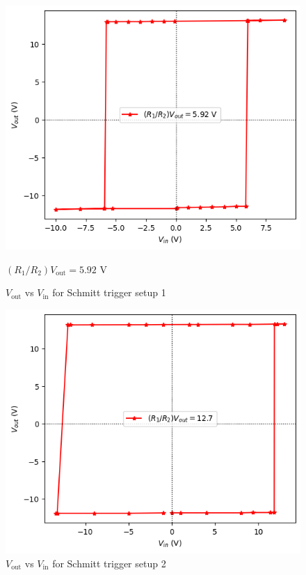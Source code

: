     \begin{figure}[H]
        \centering
        \includegraphics[width=1\columnwidth]{images/st5.png}
        \caption{$(R_1/R_2) V_\text{out} = 5.92$ V}
        \caption{$V_\text{out}$ vs $V_\text{in}$ for Schmitt trigger setup 1}
        \label{g4}
    \end{figure}
    \begin{figure}[H]
        \centering
        \includegraphics[width=1\columnwidth]{images/st12.png}
        \caption{$V_\text{out}$ vs $V_\text{in}$ for Schmitt trigger setup 2}
        \label{g5}
    \end{figure}
